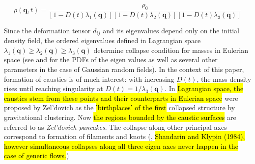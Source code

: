 \begin{equation}
 \rho(\mathbf{q}, t) = \frac{\rho_0}{ \left[1 - D(t) \lambda_1(\mathbf{q}) \right]\left[1 - D(t) \lambda_2(\mathbf{q}) \right]\left[1 - D(t) \lambda_3(\mathbf{q}) \right] }
\end{equation}

Since the deformation tensor $d_{ij}$ and its eigenvalues depend only on the initial density field, the ordered eigenvalues defined in Lagrangian space $\lambda_1(\mathbf{q}) \geq \lambda_2(\mathbf{q}) \geq \lambda_3(\mathbf{q})$ determine collapse condition for masses in Eulerian space (see \cite{Doroshkevich1973} and \cite{Lee1998} {for the PDFs  of the eigen values as well as several other parameters} in the case of Gaussian random fields). In the context of this paper, formation of caustics is of much interest: with increasing $D(t)$, the mass density rises until reaching singularity at $D(t) = 1/\lambda_3(\mathbf{q})$. In \hl{Lagrangian space, the caustics stem from these points and their counterparts  in Eulerian space} were proposed by Zel'dovich as the \hl{'birthplaces' of the first} collapsed structure by gravitational clustering. Now \hl{the regions bounded by the caustic surfaces} are referred to as {\it Zel'dovich pancakes}. The collapse along other principal axes correspond to formation of filaments and knots (\cite{Arnold1982}, \hl{Shandarin and Klypin (1984), however simultaneous collapses along all three eigen axes never happen in the case of generic flows.})

